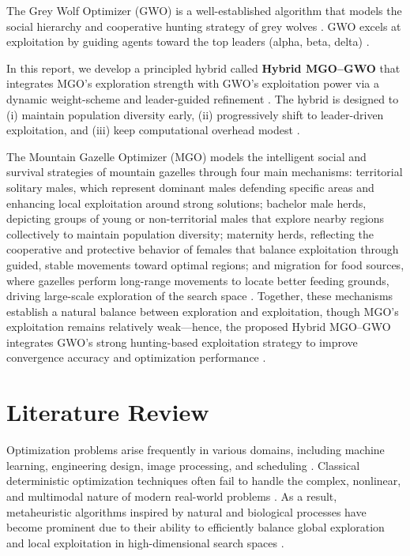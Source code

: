 \documentclass[12pt,a4paper]{article}
\begin{document}
The Grey Wolf Optimizer (GWO) is a well-established algorithm that models the social hierarchy and cooperative hunting strategy of grey wolves \cite{gwo}. GWO excels at exploitation by guiding agents toward the top leaders (alpha, beta, delta) \cite{banaie2021, balani2021}.

In this report, we develop a principled hybrid called \textbf{Hybrid MGO--GWO} that integrates MGO's exploration strength with GWO's exploitation power via a dynamic weight-scheme and leader-guided refinement \cite{mirjalili2016woa, mirjalili2015mfo}. The hybrid is designed to (i) maintain population diversity early, (ii) progressively shift to leader-driven exploitation, and (iii) keep computational overhead modest \cite{gharehchopogh2020, alsorori2020}.

The Mountain Gazelle Optimizer (MGO) models the intelligent social and survival strategies of mountain gazelles through four main mechanisms: territorial solitary males, which represent dominant males defending specific areas and enhancing local exploitation around strong solutions; bachelor male herds, depicting groups of young or non-territorial males that explore nearby regions collectively to maintain population diversity; maternity herds, reflecting the cooperative and protective behavior of females that balance exploitation through guided, stable movements toward optimal regions; and migration for food sources, where gazelles perform long-range movements to locate better feeding grounds, driving large-scale exploration of the search space \cite{mgo}. Together, these mechanisms establish a natural balance between exploration and exploitation, though MGO’s exploitation remains relatively weak—hence, the proposed Hybrid MGO–GWO integrates GWO’s strong hunting-based exploitation strategy to improve convergence accuracy and optimization performance \cite{gwo, abualigah2021aqp, elaziz2021}.

\section{Literature Review}

Optimization problems arise frequently in various domains, including machine learning, engineering design, image processing, and scheduling \cite{metaheuristics, abdollahzadeh2021a}. Classical deterministic optimization techniques often fail to handle the complex, nonlinear, and multimodal nature of modern real-world problems \cite{wolpert1997, derrac2011}. As a result, metaheuristic algorithms inspired by natural and biological processes have become prominent due to their ability to efficiently balance global exploration and local exploitation in high-dimensional search spaces \cite{metaheuristics, sheskin2020}.
\end{document}

